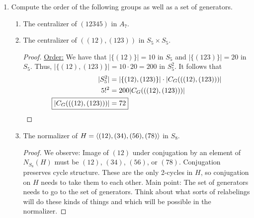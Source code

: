\documentclass[../psets.tex]{subfiles}
\begin{document}
\begin{enumerate}
\begin{proof}


        To prove that $N$ is normal, it will suffice to show that for all $z\in N$ and $g\in G$, $gzg^{-1}\in N$. Let $x^{-1}y^{-1}xy\in N$ and $g\in G$ be arbitrary. Then
        \begin{align*}
            gx^{-1}y^{-1}xyg^{-1} &= gx^{-1}(g^{-1}g)y^{-1}(g^{-1}g)x(g^{-1}g)yg^{-1}\\
            &= (gx^{-1}g^{-1})(gy^{-1}g^{-1})(gxg^{-1})(gyg^{-1})\\
            &= (gxg^{-1})^{-1}(gyg^{-1})^{-1}(gxg^{-1})(gyg^{-1})\\
            &\in N
        \end{align*}
        as desired.\par
        To prove that $G/N$ is abelian, it will suffice to show that $gN*hN=hN*gN$ for all $g,h\in G$. To do so, we can show that $ghN=hgN$, or that $g^{-1}h^{-1}ghN=N$. But since an element of the form $g^{-1}h^{-1}gh\in N$ by definition, we have the desired result.
    \end{proof}
    \item Compute the order of the following groups as well as a set of generators.
    \begin{enumerate}
        \item The centralizer of $(12345)$ in $A_7$.
        \item The centralizer of $((12),(123))$ in $S_5\times S_5$.
        \begin{proof}
            \underline{Order:} We have that $|\{(12)\}|=10$ in $S_5$ and $|\{(123)\}|=20$ in $S_5$. Thus, $|\{(12),(123)\}|=10\cdot 20=200$ in $S_5^2$. It follows that
            \begin{align*}
                |S_5^2| &= |\{(12),(123)\}|\cdot|C_G(((12),(123)))|\\
                5!^2 &= 200|C_G(((12),(123)))|\\
                \Aboxed{|C_G(((12),(123)))| &= 72}
            \end{align*}
        \end{proof}
        \item The normalizer of $H=\left\langle{(12),(34),(56),(78)}\right\rangle$ in $S_8$.
        \begin{proof}
            We observe: Image of $(12)$ under conjugation by an element of $N_{S_8}(H)$ must be $(12)$, $(34)$, $(56)$, or $(78)$. Conjugation preserves cycle structure. These are the only 2-cycles in $H$, so conjugation on $H$ needs to take them to each other. Main point: The set of generators needs to go to the set of generators. Think about what sorts of relabelings will do these kinds of things and which will be possible in the normalizer.

\end{proof}
\end{enumerate}
\end{enumerate}
\end{document}
